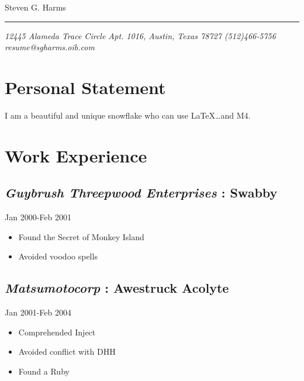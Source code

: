 \documentclass[]{article}
\begin{document}
\ifpdf
{}
\else
{}
\fi


\begin{center}
    \Huge Steven G. Harms
\end{center}
\vspace{-8pt} \rule{\textwidth}{1pt}

\vspace{-1pt} {\small\itshape 12445 Alameda Trace Circle Apt. 1016, Austin, Texas 78727 \hfill 
(512)466-5756 \hfill resume@sgharms.oib.com}





  \section*{ Personal Statement}
  I am a beautiful and unique snowflake who can use \LaTeX \ldots and M4.


\section*{Work Experience}
\label{sec: work_experience}
\subsection*{\textit{Guybrush Threepwood Enterprises} : \textbf{Swabby}}
  \label{_guybrushthreepwoodenterprises_swabby}
  \textsf{Jan 2000-Feb 2001}
\begin{itemize}
    \item Found the Secret of Monkey Island
    \item Avoided voodoo spells
\end{itemize}
       
\subsection*{\textit{Matsumotocorp} : \textbf{Awestruck Acolyte}}
  \label{_matsumotocorp_awestruckacolyte}
  \textsf{Jan 2001-Feb 2004}
\begin{itemize}
    \item Comprehended Inject
    \item Avoided conflict with DHH
    \item Found a Ruby
\end{itemize}
       
\end{document}
